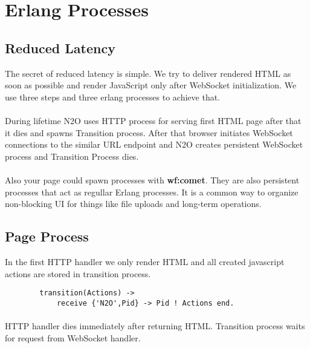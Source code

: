 \section{Erlang Processes}

\subsection{Reduced Latency}
The secret of reduced latency is simple. We try to deliver rendered HTML
as soon as possible and render JavaScript only after WebSocket initialization.
We use three steps and three erlang processes to achieve that.


\paragraph{}
During lifetime N2O uses HTTP process for serving first HTML page after that it dies
and spawns Transition process. After that browser initiates WebSocket connections
to the similar URL endpoint and N2O creates persistent WebSocket process and
Transition Process dies.

\paragraph{}
Also your page could spawn processes with {\bf wf:comet}. They are also persistent
processes that act as regullar Erlang processes. It is a common way to organize
non-blocking UI for things like file uploads and long-term operations.

\subsection{Page Process}
In the first HTTP handler we only render HTML and all created
javascript actions are stored in transition process.

\vspace{1\baselineskip}
\begin{lstlisting}
        transition(Actions) ->
            receive {'N2O',Pid} -> Pid ! Actions end.
\end{lstlisting}

\paragraph{}
HTTP handler dies immediately after returning HTML. Transition process
waits for request from WebSocket handler.

